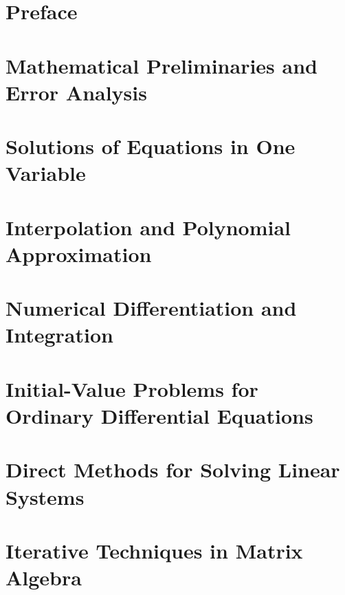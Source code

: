 \documentclass[openany]{ctexbook}
\begin{document}
\maketitle\newpage\tableofcontents\newpage
\chapter{Preface}
  \newpage

\chapter{Mathematical Preliminaries and Error Analysis}
  \newpage

\chapter{Solutions of Equations in One Variable}
  
  

\chapter{Interpolation and Polynomial Approximation}
  
  
  
  
  

\chapter{Numerical Differentiation and Integration}
  

\chapter{Initial-Value Problems for Ordinary Differential Equations}
  
  
  
  
  
  

\chapter{Direct Methods for Solving Linear Systems}
  
  

\chapter{Iterative Techniques in Matrix Algebra}
  
  
  

\end{document}
